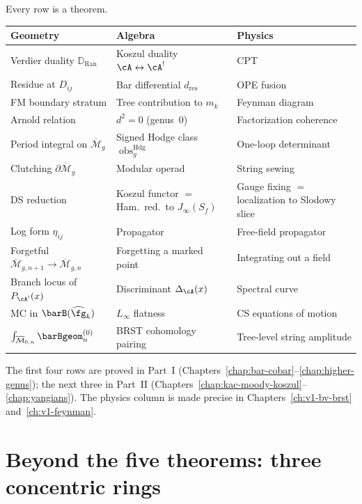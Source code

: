 \begin{remark}
\label{rem:master-functorial}
Every row is a theorem.
\begin{center}
\small
\begin{tabular}{lll}
\textbf{Geometry} & \textbf{Algebra} & \textbf{Physics} \\ \hline
Verdier duality $\mathbb{D}_{\mathrm{Ran}}$
 & Koszul duality $\cA \leftrightarrow \cA^!$
 & CPT \\[2pt]
Residue at $D_{ij}$
 & Bar differential $d_{\mathrm{res}}$
 & OPE fusion \\[2pt]
FM boundary stratum
 & Tree contribution to $m_k$
 & Feynman diagram \\[2pt]
Arnold relation
 & $d^2 = 0$ (genus~$0$)
 & Factorization coherence \\[2pt]
Period integral on $\overline{\mathcal{M}}_g$
 & Signed Hodge class $\operatorname{obs}^{\mathrm{Hdg}}_g$
 & One-loop determinant \\[2pt]
Clutching $\partial\overline{\mathcal{M}}_g$
 & Modular operad
 & String sewing \\[2pt]
DS reduction
 & Koszul functor $=$ Ham.\ red.\ to $J_\infty(S_f)$
 & Gauge fixing $=$ localization to Slodowy slice \\[2pt]
Log form $\eta_{ij}$
 & Propagator
 & Free-field propagator \\[2pt]
Forgetful $\overline{\mathcal{M}}_{g,n+1}
 \to \overline{\mathcal{M}}_{g,n}$
 & Forgetting a marked point
 & Integrating out a field \\[2pt]
Branch locus of $P_{\cA^!}(x)$
 & Discriminant $\Delta_\cA(x)$
 & Spectral curve \\[2pt]
MC in $\barB(\widehat{\fg}_k)$
 & $L_\infty$ flatness
 & CS equations of motion \\[2pt]
$\int_{\overline{\mathcal{M}}_{0,n}} \barBgeom^{(0)}_n$
 & BRST cohomology pairing
 & Tree-level string amplitude
\end{tabular}
\end{center}
The first four rows are proved in Part~\textup{I}
(Chapters~\ref{chap:bar-cobar}--\ref{chap:higher-genus});
the next three in Part~\textup{II}
(Chapters~\ref{chap:kac-moody-koszul}--\ref{chap:yangians}).
The physics column is made precise in
Chapters~\ref{ch:v1-bv-brst} and~\ref{ch:v1-feynman}.
\end{remark}

\section{Beyond the five theorems: three concentric rings}
\label{subsec:three-concentric-rings}

